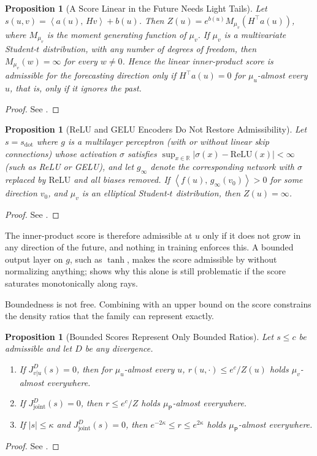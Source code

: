 \documentclass[11pt]{article}
\theoremstyle{plain}
\newtheorem{proposition}[theorem]{Proposition}
\theoremstyle{definition}
\theoremstyle{remark}
\newcommand{\RR}{\mathbb{R}}
\newcommand{\muP}{\mu_{\mathsf{P}}}
\newcommand{\IP}[2]{\left\langle #1,\, #2 \right\rangle}
\newcommand{\abs}[1]{\left\lvert #1 \right\rvert}
\newcommand{\sdot}{s_{\mathrm{dot}}}
\newcommand{\Jvu}{J_{v\vert u}}
\newcommand{\Jjoint}{J_{\mathrm{joint}}}
\begin{document}
\begin{proposition}[A Score Linear in the Future Needs Light Tails]
 \label{prop:linear}
 Let $s(u,v)=\IP{a(u)}{Hv}+b(u)$. Then $Z(u)=e^{b(u)}M_{\mu_v}(H^{\top}a(u))$,
 where $M_{\mu_v}$ is the moment generating function of $\mu_v$. If $\mu_v$
 is a multivariate Student-$t$ distribution, with any number of degrees of
 freedom, then $M_{\mu_v}(w)=\infty$ for every $w\neq0$. Hence the linear
 inner-product score is admissible for the forecasting direction only if
 $H^{\top}a(u)=0$ for $\mu_u$-almost every $u$, that is, only if it ignores
 the past.
\end{proposition}
\begin{proof}
 See .
\end{proof}

\begin{proposition}[ReLU and GELU Encoders Do Not Restore Admissibility]
 \label{prop:relu}
 Let $s=\sdot$ where $g$ is a multilayer perceptron (with or without linear
 skip connections) whose activation $\sigma$ satisfies
 $\sup_{x\in\RR}\abs{\sigma(x)-\mathrm{ReLU}(x)}<\infty$ (such as ReLU or
 GELU), and let $g_\infty$ denote the corresponding network with $\sigma$
 replaced by $\mathrm{ReLU}$ and all biases removed. If
 $\IP{f(u)}{g_\infty(v_0)}>0$ for some direction $v_0$, and $\mu_v$ is an
 elliptical Student-$t$ distribution, then $Z(u)=\infty$.
\end{proposition}
\begin{proof}
 See .
\end{proof}

The inner-product score is therefore admissible at $u$ only if it does not
grow in any direction of the future, and nothing in training enforces this.
A bounded output layer on $g$, such as $\tanh$, makes the score admissible by
 without normalizing anything; 
shows why this alone is still problematic if the score saturates monotonically
along rays.

Boundedness is not free. Combining  with an upper bound on
the score constrains the density ratios that the family can represent
exactly.

\begin{proposition}[Bounded Scores Represent Only Bounded Ratios]
 \label{prop:price}
 Let $s\le c$ be admissible and let $D$ be any divergence.
 \begin{enumerate}[label=(\roman*)]
  \item If $\Jvu^{D}(s)=0$, then for $\mu_u$-almost every $u$,
        $r(u,\cdot)\le e^{c}/Z(u)$ holds $\mu_v$-almost everywhere.
  \item If $\Jjoint^{D}(s)=0$, then $r\le e^{c}/Z$ holds $\muP$-almost
        everywhere.
  \item If $\abs{s}\le\kappa$ and $\Jjoint^{D}(s)=0$, then
        $e^{-2\kappa}\le r\le e^{2\kappa}$ holds $\muP$-almost everywhere.
 \end{enumerate}
\end{proposition}
\begin{proof}
 See .
\end{proof}
\end{document}
